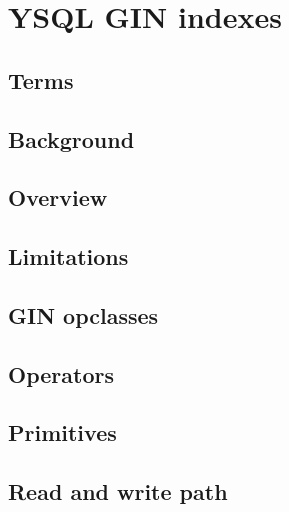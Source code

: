 \documentclass[11pt]{article}
\begin{document}
\hypertarget{ysql-gin-indexes}{%
\section{YSQL GIN indexes}\label{ysql-gin-indexes}}

\hypertarget{terms}{%
\subsection{Terms}\label{terms}}


\hypertarget{background}{%
\subsection{Background}\label{background}}


\hypertarget{overview}{%
\subsection{Overview}\label{overview}}


\hypertarget{limitations}{%
\subsection{Limitations}\label{limitations}}


\hypertarget{gin-opclasses}{%
\subsection{GIN opclasses}\label{gin-opclasses}}


\hypertarget{operators}{%
\subsection{Operators}\label{operators}}


\hypertarget{primitives}{%
\subsection{Primitives}\label{primitives}}


\hypertarget{read-and-write-path}{%
\subsection{Read and write path}\label{read-and-write-path}}
\end{document}
